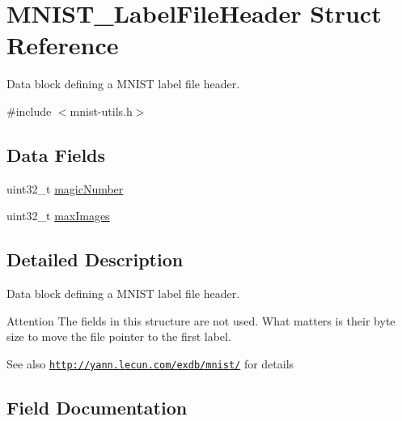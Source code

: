 \hypertarget{struct_m_n_i_s_t___label_file_header}{}\section{M\+N\+I\+S\+T\+\_\+\+Label\+File\+Header Struct Reference}
\label{struct_m_n_i_s_t___label_file_header}


Data block defining a M\+N\+I\+S\+T label file header.  




{\ttfamily \#include $<$mnist-\/utils.\+h$>$}

\subsection*{Data Fields}
\begin{DoxyCompactItemize}
\item 
uint32\+\_\+t \hyperlink{struct_m_n_i_s_t___label_file_header_a3081fb3d81f6a8484b9451a66e4d1dba}{magic\+Number}
\item 
uint32\+\_\+t \hyperlink{struct_m_n_i_s_t___label_file_header_a0c2553aeb6074229351ddfd76c613831}{max\+Images}
\end{DoxyCompactItemize}


\subsection{Detailed Description}
Data block defining a M\+N\+I\+S\+T label file header. 

\begin{DoxyAttention}{Attention}
The fields in this structure are not used. What matters is their byte size to move the file pointer to the first label. 
\end{DoxyAttention}
\begin{DoxySeeAlso}{See also}
\href{http://yann.lecun.com/exdb/mnist/}{\tt http\+://yann.\+lecun.\+com/exdb/mnist/} for details 
\end{DoxySeeAlso}


\subsection{Field Documentation}
\hypertarget{struct_m_n_i_s_t___label_file_header_a3081fb3d81f6a8484b9451a66e4d1dba}{}
